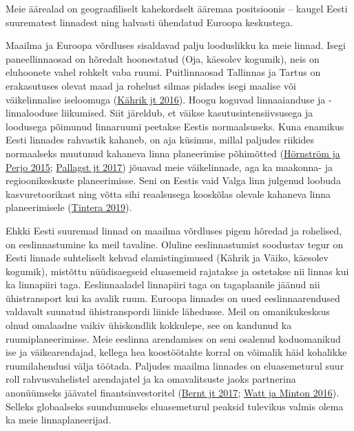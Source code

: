 \documentclass[estonian,]{article}
\begin{document}
\begin{blockquote-right}
Meie äärealad on geograafiliselt kahekordselt ääremaa positsioonis --
kaugel Eesti suurematest linnadest ning halvasti ühendatud Euroopa
keskustega.
\end{blockquote-right}

Maailma ja Euroopa võrdluses sisaldavad palju looduslikku ka meie linnad. Isegi paneellinnaosad on hõredalt hoonestatud (Oja, käesolev kogumik), neis on eluhoonete vahel rohkelt vaba ruumi. Puitlinnaosad Tallinnas ja Tartus on erakasutuses olevat maad ja rohelust silmas pidades isegi maalise või väikelinnalise iseloomuga (\protect\hyperlink{Kuxe4hrik2016}{Kährik jt 2016}). Hoogu koguvad linnaaianduse ja -linnalooduse liikumised. Siit järeldub, et väikse kasutusintensiivsusega ja loodusega põimunud linnaruumi peetakse Eestis normaalsuseks. Kuna enamikus Eesti linnades rahvastik kahaneb, on aja küsimus, millal paljudes riikides normaalseks muutunud kahaneva linna planeerimise põhimõtted (\protect\hyperlink{Huxf6rnstruxf6m2015}{Hörnström ja Perjo 2015}; \protect\hyperlink{Pallagst2017}{Pallagst jt 2017}) jõuavad meie väikelinnade, aga ka maakonna- ja regioonikeskuste planeerimisse. Seni on Eestis vaid Valga linn julgenud loobuda kasvuretoorikast ning võtta sihi reaalsusega kooskõlas olevale kahaneva linna planeerimisele (\protect\hyperlink{Tintera2019}{Tintera 2019}).

Ehkki Eesti suuremad linnad on maailma võrdluses pigem hõredad ja rohelised, on eeslinnastumine ka meil tavaline. Oluline eeslinnastumist soodustav tegur on Eesti linnade suhteliselt kehvad elamistingimused (Kährik ja Väiko, käesolev kogumik), mistõttu nüüdisaegseid eluasemeid rajatakse ja ostetakse nii linnas kui ka linnapiiri taga. Eeslinnaaladel linnapiiri taga on tagaplaanile jäänud nii ühistransport kui ka avalik ruum. Euroopa linnades on uued eeslinnaarendused valdavalt suunatud ühistranspordi liinide lähedusse. Meil on omanikukesksus olnud omalaadne vaikiv ühiskondlik kokkulepe, see on kandunud ka ruumiplaneerimisse. Meie eeslinna arendamises on seni osalenud koduomanikud ise ja väikearendajad, kellega hea koostöötahte korral on võimalik häid kohalikke ruumilahendusi välja töötada. Paljudes maailma linnades on eluasemeturul suur roll rahvusvahelistel arendajatel ja ka omavalitsuste jaoks partnerina anonüümseks jäävatel finantsinvestoritel (\protect\hyperlink{Bernt2017}{Bernt jt 2017}; \protect\hyperlink{Watt2016}{Watt ja Minton 2016}). Selleks globaalseks suundumuseks eluasemeturul peaksid tulevikus valmis olema ka meie linnaplaneerijad.
\end{document}
